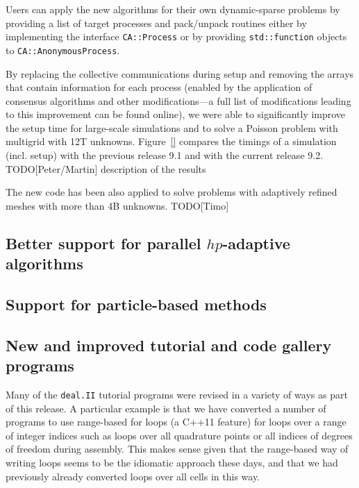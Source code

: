 \documentclass{ansarticle-preprint}
\newcommand{\specialword}[1]{\texttt{#1}}
\newcommand{\dealii}{{\specialword{deal.II}}\xspace}
\begin{document}
Users can apply the new algorithms for their own dynamic-sparse problems by 
providing a list of target 
processes and pack/unpack routines either by implementing the interface 
\texttt{CA::\allowbreak Process} or by providing \texttt{std::function} 
objects to \texttt{CA::AnonymousProcess}.

By replacing the collective communications during setup and removing the arrays 
that contain information for each process (enabled by the application of consensus 
algorithms and other modifications---a full list of modifications leading to this 
improvement can be found online), we were able to significantly improve the setup 
time for large-scale simulations and to solve a Poisson problem with multigrid 
with 12T unknowns. 
Figure~\ref{} compares the timings of a simulation (incl. setup) with the 
previous release 9.1 and with the current release 9.2. 
{\color{red}TODO[Peter/Martin] description of the results}

The new code has been also applied to solve problems with adaptively refined 
meshes with more than 4B unknowns. {\color{red}TODO[Timo]}


\subsection{Better support for parallel $hp$-adaptive algorithms}
\label{subsec:hp}



\subsection{Support for particle-based methods}
\label{subsec:particles}



\subsection{New and improved tutorial and code gallery programs}
\label{subsec:steps}

Many of the \dealii{} tutorial programs were revised in a variety of
ways as part of this release. A particular example is that we have
converted a number of programs to use range-based for loops (a C++11
feature) for loops over a range of integer indices such as loops over
all quadrature points or all indices of degrees of freedom during
assembly. This makes sense given that the
range-based way of writing loops seems to be the idiomatic approach
these days, and that we had previously already converted loops over
all cells in this way.
\end{document}
